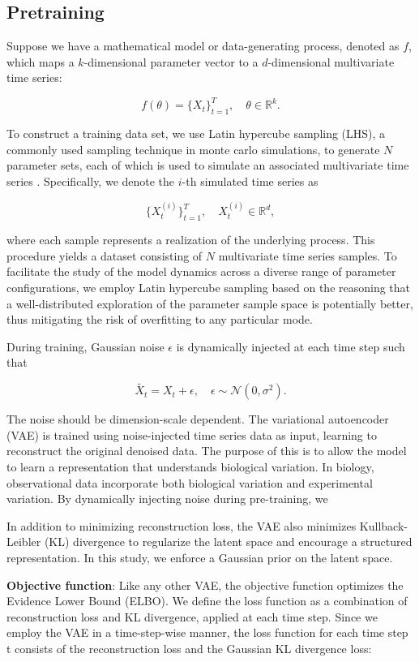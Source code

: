 \documentclass[12pt]{article} %
\begin{document}
\subsection{Pretraining}
Suppose we have a mathematical model or data-generating process, denoted as \( f \), which maps a \( k \)-dimensional parameter vector to a \( d \)-dimensional multivariate time series:  

$$
f(\theta) = \{X_t\}_{t=1}^T, \quad \theta \in \mathbb{R}^k.
$$  

To construct a training data set, we use Latin hypercube sampling (LHS), a commonly used sampling technique in monte carlo simulations, to generate \( N \)  parameter sets, each of which is used to simulate an associated multivariate time series \citep{}. Specifically, we denote the \( i \)-th simulated time series as  

$$
\{X_{t}^{(i)}\}_{t=1}^T, \quad X_t^{(i)} \in \mathbb{R}^d,
$$  

where each sample represents a realization of the underlying process. This procedure yields a dataset consisting of \( N \) multivariate time series samples. To facilitate the study of the model dynamics across a diverse range of parameter configurations, we employ Latin hypercube sampling based on the reasoning that a well-distributed exploration of the parameter sample space is potentially better, thus mitigating the risk of overfitting to any particular mode\citep{mckay2000comparison}. 

During training, Gaussian noise \( \epsilon \) is dynamically injected at each time step such that  

$$
\tilde{X_t} = X_t + \epsilon, \quad \epsilon \sim \mathcal{N}(0, \sigma^2).
$$  

The noise should be dimension-scale dependent. The variational autoencoder (VAE) is trained using noise-injected time series data as input, learning to reconstruct the original denoised data. The purpose of this is to allow the model to learn a representation that understands biological variation. In biology, observational data incorporate both biological variation and experimental variation. By dynamically injecting noise during pre-training, we

In addition to minimizing reconstruction loss, the VAE also minimizes Kullback-Leibler (KL) divergence to regularize the latent space and encourage a structured representation. In this study, we enforce a Gaussian prior on the latent space.

\textbf{Objective function}: Like any other VAE, the objective function optimizes the Evidence Lower Bound (ELBO). We define the loss function as a combination of reconstruction loss and KL divergence, applied at each time step. Since we employ the VAE in a time-step-wise manner, the loss function for each time step t consists of the reconstruction loss and the Gaussian KL divergence loss:
\end{document}
